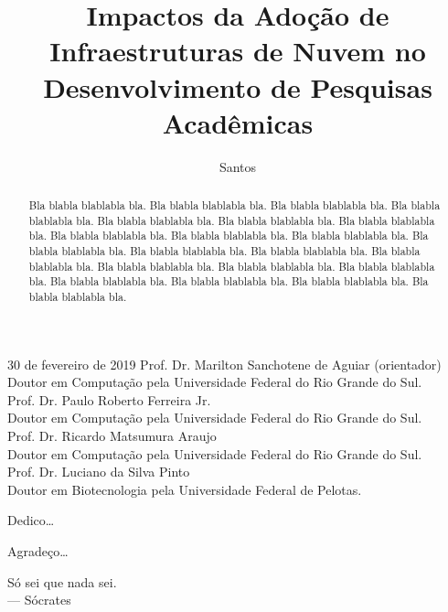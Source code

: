 \documentclass[tese,capa]{texufpel}
\title{Impactos da Adoção de Infraestruturas de Nuvem no Desenvolvimento de Pesquisas Acadêmicas}
\author{Santos}{Maicon Ança dos}
\begin{document}
\maketitle 

\sloppy

\fichacatalografica

\begin{aprovacao}{30 de fevereiro de 2019} %
\noindent Prof. Dr. Marilton Sanchotene de Aguiar (orientador)\\
Doutor em Computação pela Universidade Federal do Rio Grande do Sul.\\[1cm]

\noindent Prof. Dr. Paulo Roberto Ferreira Jr.\\
Doutor em Computação pela Universidade Federal do Rio Grande do Sul.\\[1cm]

\noindent Prof. Dr. Ricardo Matsumura Araujo\\
Doutor em Computação pela Universidade Federal do Rio Grande do Sul.\\[1cm]

\noindent Prof. Dr. Luciano da Silva Pinto\\
Doutor em Biotecnologia pela Universidade Federal de Pelotas.
\end{aprovacao}

\begin{dedicatoria}
  Dedico\ldots 
\end{dedicatoria}

\begin{agradecimentos}
  Agradeço\ldots 
\end{agradecimentos}

\begin{epigrafe}
  Só sei que nada sei.\\
  {\sc --- Sócrates}
\end{epigrafe}

\begin{abstract}
Bla blabla blablabla bla.  Bla blabla blablabla bla.  Bla blabla
blablabla bla.  Bla blabla blablabla bla.  Bla blabla blablabla bla.
Bla blabla blablabla bla.  Bla blabla blablabla bla.  Bla blabla
blablabla bla.  Bla blabla blablabla bla.  Bla blabla blablabla bla.
Bla blabla blablabla bla.  Bla blabla blablabla bla.  Bla blabla
blablabla bla.  Bla blabla blablabla bla.  Bla blabla blablabla bla.
Bla blabla blablabla bla.  Bla blabla blablabla bla.  Bla blabla
blablabla bla.  Bla blabla blablabla bla.  Bla blabla blablabla bla.
Bla blabla blablabla bla.
\end{abstract}
\end{document}
